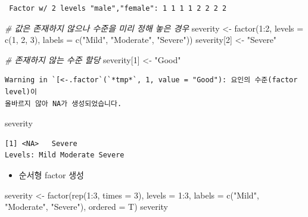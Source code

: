 \documentclass[
  11pt,
]{krantz}
\newenvironment{Shaded}{\begin{snugshade}}{\end{snugshade}}
\newcommand{\AttributeTok}[1]{\textcolor[rgb]{0.61,0.61,0.61}{#1}}
\newcommand{\CommentTok}[1]{\textcolor[rgb]{0.37,0.37,0.37}{\textit{#1}}}
\newcommand{\DecValTok}[1]{\textcolor[rgb]{0.06,0.06,0.06}{#1}}
\newcommand{\FunctionTok}[1]{\textcolor[rgb]{0,0,0}{#1}}
\newcommand{\NormalTok}[1]{#1}
\newcommand{\OtherTok}[1]{\textcolor[rgb]{0.37,0.37,0.37}{#1}}
\newcommand{\SpecialCharTok}[1]{\textcolor[rgb]{0,0,0}{#1}}
\newcommand{\StringTok}[1]{\textcolor[rgb]{0.5,0.5,0.5}{#1}}
\providecommand{\tightlist}{%
  \setlength{\itemsep}{0pt}\setlength{\parskip}{0pt}}
\begin{document}
\begin{verbatim}
 Factor w/ 2 levels "male","female": 1 1 1 1 2 2 2 2
\end{verbatim}

\begin{Shaded}
\begin{Highlighting}[]
\CommentTok{\# 값은 존재하지 않으나 수준을 미리 정해 놓은 경우}
\NormalTok{severity }\OtherTok{\textless{}{-}} \FunctionTok{factor}\NormalTok{(}\DecValTok{1}\SpecialCharTok{:}\DecValTok{2}\NormalTok{, }\AttributeTok{levels =} \FunctionTok{c}\NormalTok{(}\DecValTok{1}\NormalTok{, }\DecValTok{2}\NormalTok{, }\DecValTok{3}\NormalTok{), }\AttributeTok{labels =} \FunctionTok{c}\NormalTok{(}\StringTok{"Mild"}\NormalTok{, }\StringTok{"Moderate"}\NormalTok{, }\StringTok{"Severe"}\NormalTok{))}
\NormalTok{severity[}\DecValTok{2}\NormalTok{] }\OtherTok{\textless{}{-}} \StringTok{"Severe"}

\CommentTok{\# 존재하지 않는 수준 할당 }
\NormalTok{severity[}\DecValTok{1}\NormalTok{] }\OtherTok{\textless{}{-}} \StringTok{"Good"}
\end{Highlighting}
\end{Shaded}

\begin{verbatim}
Warning in `[<-.factor`(`*tmp*`, 1, value = "Good"): 요인의 수준(factor level)이
올바르지 않아 NA가 생성되었습니다.
\end{verbatim}

\begin{Shaded}
\begin{Highlighting}[]
\NormalTok{severity}
\end{Highlighting}
\end{Shaded}

\begin{verbatim}
[1] <NA>   Severe
Levels: Mild Moderate Severe
\end{verbatim}

\normalsize

\begin{itemize}
\tightlist
\item
  순서형 factor 생성
\end{itemize}

\footnotesize

\begin{Shaded}
\begin{Highlighting}[]
\NormalTok{severity }\OtherTok{\textless{}{-}} \FunctionTok{factor}\NormalTok{(}\FunctionTok{rep}\NormalTok{(}\DecValTok{1}\SpecialCharTok{:}\DecValTok{3}\NormalTok{, }\AttributeTok{times =} \DecValTok{3}\NormalTok{), }\AttributeTok{levels =} \DecValTok{1}\SpecialCharTok{:}\DecValTok{3}\NormalTok{, }
                   \AttributeTok{labels =} \FunctionTok{c}\NormalTok{(}\StringTok{"Mild"}\NormalTok{, }\StringTok{"Moderate"}\NormalTok{, }\StringTok{"Severe"}\NormalTok{), }
                   \AttributeTok{ordered =}\NormalTok{ T)}
\NormalTok{severity}
\end{Highlighting}
\end{Shaded}
\end{document}
